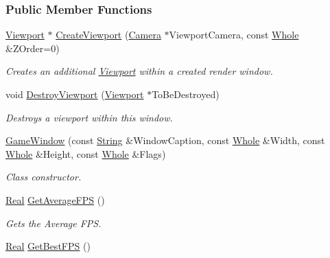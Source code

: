 \subsubsection*{Public Member Functions}
\begin{DoxyCompactItemize}
\item 
\hyperlink{classphys_1_1Viewport}{Viewport} $\ast$ \hyperlink{classphys_1_1GameWindow_a85802f1c30d43bb2992f95ac58683961}{CreateViewport} (\hyperlink{classphys_1_1Camera}{Camera} $\ast$ViewportCamera, const \hyperlink{namespacephys_a460f6bc24c8dd347b05e0366ae34f34a}{Whole} \&ZOrder=0)
\begin{DoxyCompactList}\small\item\em Creates an additional \hyperlink{classphys_1_1Viewport}{Viewport} within a created render window. \item\end{DoxyCompactList}\item 
void \hyperlink{classphys_1_1GameWindow_ac9c359317e9a1612fbc5fef886de4040}{DestroyViewport} (\hyperlink{classphys_1_1Viewport}{Viewport} $\ast$ToBeDestroyed)
\begin{DoxyCompactList}\small\item\em Destroys a viewport within this window. \item\end{DoxyCompactList}\item 
\hyperlink{classphys_1_1GameWindow_ad7b69b7f128ca12ed18bcaca4c638a4e}{GameWindow} (const \hyperlink{namespacephys_aa03900411993de7fbfec4789bc1d392e}{String} \&WindowCaption, const \hyperlink{namespacephys_a460f6bc24c8dd347b05e0366ae34f34a}{Whole} \&Width, const \hyperlink{namespacephys_a460f6bc24c8dd347b05e0366ae34f34a}{Whole} \&Height, const \hyperlink{namespacephys_a460f6bc24c8dd347b05e0366ae34f34a}{Whole} \&Flags)
\begin{DoxyCompactList}\small\item\em Class constructor. \item\end{DoxyCompactList}\item 
\hyperlink{namespacephys_af7eb897198d265b8e868f45240230d5f}{Real} \hyperlink{classphys_1_1GameWindow_a3ec29af7b989701e3c14409f34497a15}{GetAverageFPS} ()
\begin{DoxyCompactList}\small\item\em Gets the Average FPS. \item\end{DoxyCompactList}\item 
\hyperlink{namespacephys_af7eb897198d265b8e868f45240230d5f}{Real} \hyperlink{classphys_1_1GameWindow_ab0fbfc031d5ace19cd79d8c3e6c8f4aa}{GetBestFPS} ()

\end{DoxyCompactItemize}
